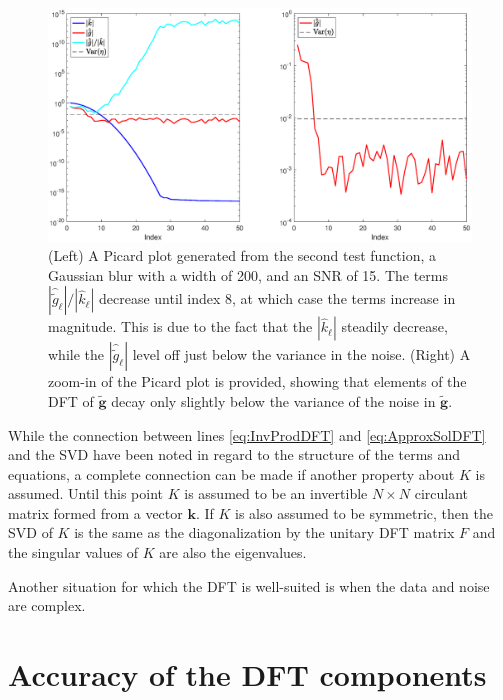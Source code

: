 \documentclass[12pt]{book}
\newcommand{\gnoise}{\widetilde{g}}	%
\newcommand{\gnoiseVec}{\widetilde{\mathbf{g}}}	%
\newcommand{\kVec}{\mathbf{k}}	%
\newcommand{\kMat}{K}	%
\begin{document}
\begin{figure}[htb]
	\centerline{\includegraphics[scale = 0.45]{Figures/PicardPlot1D_F2_S15_W200.eps}}
\caption{(Left) A Picard plot generated from the second test function, a Gaussian blur with a width of 200, and an SNR of 15. The terms $|\widehat{\gnoise}_\ell|/|\widehat{k}_\ell|$ decrease until index 8, at which case the terms increase in magnitude. This is due to the fact that the $|\widehat{k}_\ell|$ steadily decrease, while the $|\widehat{\gnoise}_\ell|$ level off just below the variance in the noise. (Right) A zoom-in of the Picard plot is provided, showing that elements of the DFT of $\gnoiseVec$ decay only slightly below the variance of the noise in $\gnoiseVec$.}
\label{PicardPlot}
\end{figure}

While the connection between lines \eqref{eq:InvProdDFT} and \eqref{eq:ApproxSolDFT} and the SVD have been noted in regard to the structure of the terms and equations, a complete connection can be made if another property about $\kMat$ is assumed. Until this point $\kMat$ is assumed to be an invertible $N \times N$ circulant matrix formed from a vector $\kVec$. If $\kMat$ is also assumed to be symmetric, then the SVD of $\kMat$ is the same as the diagonalization by the unitary DFT matrix $F$ and the singular values of $\kMat$ are also the eigenvalues. \par 
Another situation for which the DFT is well-suited is when the data and noise are complex.  

\section{Accuracy of the DFT components} \label{sec:Accuracy of DFT}
\end{document}
